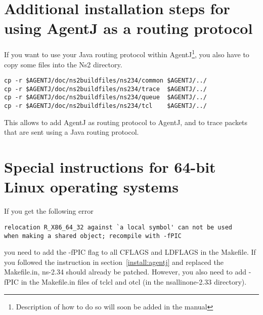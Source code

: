 \section{Additional installation steps for using AgentJ as a routing protocol}
\label{sec:additionalinstall}
If you want to use your Java routing protocol within AgentJ\footnote{Description of how to do so will soon be added in the manual}, you also have to copy some files into the Ns2 directory.

\begin{verbatim}
cp -r $AGENTJ/doc/ns2buildfiles/ns234/common $AGENTJ/../
cp -r $AGENTJ/doc/ns2buildfiles/ns234/trace  $AGENTJ/../
cp -r $AGENTJ/doc/ns2buildfiles/ns234/queue  $AGENTJ/../
cp -r $AGENTJ/doc/ns2buildfiles/ns234/tcl    $AGENTJ/../
\end{verbatim}

This allows to add AgentJ as routing protocol to AgentJ, and to trace packets that are sent using a Java routing protocol.



\section{Special instructions for 64-bit Linux operating systems}
\label{sec:install64bits}

If you get the following error

\begin{verbatim}
relocation R_X86_64_32 against `a local symbol' can not be used
when making a shared object; recompile with -fPIC
\end{verbatim}

you need to add the -fPIC flag to all CFLAGS and LDFLAGS in the Makefile. If you followed the instruction in section~\ref{install:agentj} and replaced the Makefile.in, ns-2.34 should already be patched. However, you also need to add -fPIC in the Makefile.in files of tclcl and otcl (in the nsallinone-2.33 directory).







 
 
